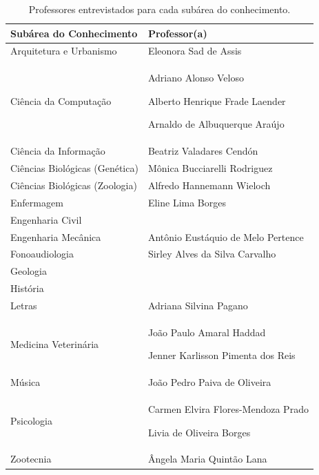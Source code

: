 \begin{table}
    \caption{Professores entrevistados para cada subárea do conhecimento.}
    \begin{center}
        \begin{tabular}{|p{6cm}|p{8cm}|}
            \hline 
            \textbf{Subárea do Conhecimento} & \textbf{Professor(a)}\\ 
            \hline 
            Arquitetura e Urbanismo & Eleonora Sad de Assis \\
            \hline
            Ciência da Computação & Adriano Alonso Veloso \par 
                                    Alberto Henrique Frade Laender \par 
                                    Arnaldo de Albuquerque Araújo \\
            \hline
            Ciência da Informação & Beatriz Valadares Cendón \\
            \hline
            Ciências Biológicas (Genética) & Mônica Bucciarelli Rodriguez \\
            \hline
            Ciências Biológicas (Zoologia) & Alfredo Hannemann Wieloch \\
            \hline
            Enfermagem & Eline Lima Borges \\
            \hline
            Engenharia Civil & \\
            \hline
            Engenharia Mecânica & Antônio Eustáquio de Melo Pertence \\
            \hline
            Fonoaudiologia & Sirley Alves da Silva Carvalho \\
            \hline
            Geologia & \\
            \hline
            História & \\
            \hline
            Letras & Adriana Silvina Pagano \\
            \hline
            Medicina Veterinária & João Paulo Amaral Haddad \par
                                   Jenner Karlisson Pimenta dos Reis \\
            \hline
            Música &  João Pedro Paiva de Oliveira \\
            \hline
            Psicologia & Carmen Elvira Flores-Mendoza Prado \par
                         Livia de Oliveira Borges \\
            \hline
            Zootecnia & Ângela Maria Quintão Lana \\
            \hline
        \end{tabular}
    \end{center}
    \label{tab:subareas-professores}
\end{table}


